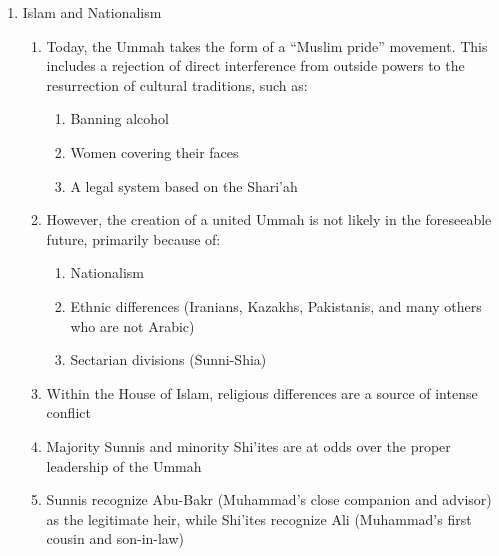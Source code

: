 \documentclass[12pt]{article}
\begin{document}
\begin{enumerate}
      \item Islam and Nationalism

        \begin{enumerate}

          \item Today, the Ummah takes the form of a “Muslim pride” movement. This includes a rejection of direct interference from outside powers to the resurrection of cultural traditions, such as:

            \begin{enumerate}

              \item Banning alcohol

              \item Women covering their faces

              \item A legal system based on the Shari'ah

            \end{enumerate}

          \item However, the creation of a united Ummah is not likely in the foreseeable future, primarily because of:

            \begin{enumerate}

              \item Nationalism

              \item Ethnic differences (Iranians, Kazakhs, Pakistanis, and many others who are not Arabic)

              \item Sectarian divisions (Sunni-Shia)

            \end{enumerate}

          \item Within the House of Islam, religious differences are a source of intense conflict

          \item Majority Sunnis and minority Shi’ites are at odds over the proper leadership of the Ummah

          \item Sunnis recognize Abu-Bakr (Muhammad’s close companion and advisor) as the legitimate heir, while Shi’ites recognize Ali (Muhammad’s first cousin and son-in-law)

        \end{enumerate}

    \end{enumerate}
\end{document}
